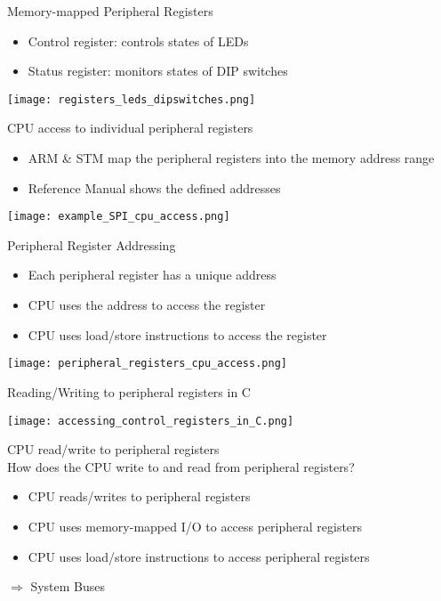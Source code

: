 \begin{definition}{Memory-mapped Peripheral Registers}
    \begin{itemize}
        \item Control register: controls states of LEDs
        \item Status register: monitors states of DIP switches
    \end{itemize}
    \vspace{1mm}
    \texttt{[image: registers\_leds\_dipswitches.png]}
\end{definition}

\multend

\begin{concept}{CPU access to individual peripheral registers}
    \begin{itemize}
        \item ARM \& STM map the peripheral registers into
        the memory address range
        \item Reference Manual shows the defined addresses
    \end{itemize}
    \vspace{2mm}
    \texttt{[image: example\_SPI\_cpu\_access.png]}
\end{concept}


\begin{definition}{Peripheral Register Addressing}
    \begin{itemize}
        \item Each peripheral register has a unique address
        \item CPU uses the address to access the register
        \item CPU uses load/store instructions to access the register
    \end{itemize}
    \texttt{[image: peripheral\_registers\_cpu\_access.png]}
\end{definition}

\begin{examplecode}{Reading/Writing to peripheral registers in C}
    
\end{examplecode}

\texttt{[image: accessing\_control\_registers\_in\_C.png]}

\begin{concept}{CPU read/write to peripheral registers}\\
    How does the CPU write to and read from peripheral registers?
    \vspace{-2mm}\\
    \begin{itemize}
        \item CPU reads/writes to peripheral registers
        \item CPU uses memory-mapped I/O to access peripheral registers
        \item CPU uses load/store instructions to access peripheral registers
    \end{itemize}
    $\Rightarrow$ System Buses
\end{concept}
\multend


